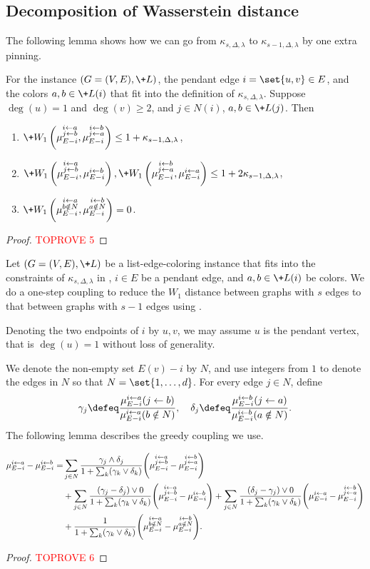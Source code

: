 \documentclass[a4paper,11pt]{article}
\newcommand{\W}[1]{\+W_1\left(#1\right)}
\begin{document}
\subsection{Decomposition of Wasserstein distance}\label{sec:coupling}


The following lemma shows how we can go from $\kappa_{s, \Delta, \lambda}$ to $\kappa_{s-1, \Delta, \lambda}$
by one extra pinning.
\begin{lemma}\label{lem:s-to-s-1}
    For the instance $(G=(V, E), \+L)$, the pendant edge $i=\set{u, v}\in E$, and the colors $a, b\in \+L(i)$
    that fit into the definition of $\kappa_{s, \Delta, \lambda}$. 
    Suppose $\deg(u)=1$ and $\deg(v)\ge 2$, and $j\in N(i)$, $a, b\in \+L(j)$.
    Then
    \begin{enumerate}
        \item $\W{\mab, \mba} \le 1 + \kappa_{s-1, \Delta, \lambda}$,
        \item $\W{\mab, \mb}, \W{\mba, \ma} \le 1 + 2\kappa_{s-1, \Delta, \lambda}$,
        \item $\W{\man, \mbn} = 0$.
    \end{enumerate}
\end{lemma}
\begin{proof}\textcolor{red}{TOPROVE 5}\end{proof}

Let $(G=(V, E), \+L)$ be a list-edge-coloring instance that fits into the constraints of $\kappa_{s, \Delta, \lambda}$ in , $i\in E$ be a pendant edge, and $a, b\in \+L(i)$ be colors. We do a one-step coupling to reduce the $W_1$ distance between graphs with $s$ edges to that between graphs with $s-1$ edges using .

Denoting the two endpoints of $i$ by $u, v$, we may assume $u$ is the pendant vertex, that is $\deg(u) = 1$ without loss of generality.
    
We denote the non-empty set $E(v)-i$ by $N$, and use integers from $1$ to denote the edges in $N$ so that $N = \set{1, \ldots, d}$. For every edge $j\in N$, define
\begin{align*}
    \gamma_j\defeq \frac{\pab}{\pan}, \quad
    \delta_j\defeq \frac{\pba}{\pbn}.
\end{align*}
The following lemma describes the greedy coupling we use.
\begin{lemma}
    \begin{align*}
        \mu_{E-i}^{i\leftarrow a}-\mu_{E-i}^{i\leftarrow b}
          =&\sum_{j\in N}\frac{\gamma_j\wedge\delta_j}{1+\sum_k(\gamma_k\vee\delta_k)}\Bigg(\mu_{E-i}^{\substack{i\leftarrow a\\j\leftarrow b}} - \mu_{E-i}^{\substack{i\leftarrow b\\j\leftarrow a}}\Bigg)
        \\&+\sum_{j\in N}\frac{(\gamma_j-\delta_j)\vee 0}{1+\sum_k(\gamma_k\vee\delta_k)}\Bigg(\mu_{E-i}^{\substack{i\leftarrow a\\j\leftarrow b}}-\mu_{E-i}^{i\leftarrow b}\Bigg)
           +\sum_{j\in N}\frac{(\delta_j-\gamma_j)\vee 0}{1+\sum_k(\gamma_k\vee\delta_k)}\Bigg(\mu_{E-i}^{i\leftarrow a}-\mu_{E-i}^{\substack{i\leftarrow b\\j\leftarrow a}}\Bigg)
        \\&+\frac{1}{1+\sum_k(\gamma_k\vee\delta_k)}\Bigg(\mu_{E-i}^{\substack{i\leftarrow a\\b\notin N}}-\mu_{E-i}^{\substack{i\leftarrow b\\a\notin N}}\Bigg).
    \end{align*}
\end{lemma}
\begin{proof}\textcolor{red}{TOPROVE 6}\end{proof}
\end{document}
